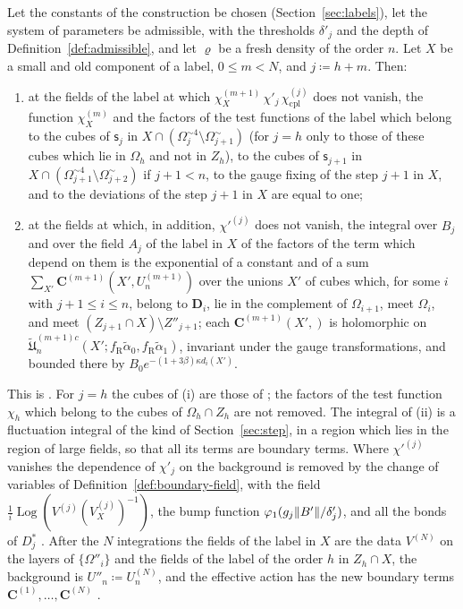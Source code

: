 \documentclass[11pt]{preprint}
\makeatletter
\DeclarePairedDelimiter{\norm}{\lVert}{\rVert}
\newcommand*{\bigcdot}{}%
\DeclareRobustCommand*{\bigcdot}{%
	\mathbin{\mathpalette\bigcdot@{}}%
}
\newcommand*{\bigcdot@scalefactor}{.7}
\newcommand*{\bigcdot@widthfactor}{1.15}
\newcommand*{\bigcdot@}[2]{%
	\sbox0{$#1\vcenter{}$}%
	\sbox2{$#1\cdot\m@th$}%
	\hbox to \bigcdot@widthfactor\wd2{%
		\hss
		\raise\ht0\hbox{%
			\scalebox{\bigcdot@scalefactor}{%
				\lower\ht0\hbox{$#1\bullet\m@th$}%
			}%
		}%
		\hss
	}%
}
\numberwithin{equation}{section}
\makeatother
\begin{document}
\begin{proposition}\label{prop:preparatory}
Let the constants of the construction be chosen (Section~\ref{sec:labels}), let the system of parameters be admissible, with the thresholds $\delta'_j$ and the depth of Definition~\ref{def:admissible}, and let $\varrho$ be a fresh density of the order $n$. Let $X$ be a small and old component of a label, $0 \leqslant m < N$, and $j \coloneqq h + m$. Then:
\begin{enumerate}[label=(\roman*)]
\item at the fields of the label at which $\chi^{(m+1)}_X\,\chi'_j\,\chi^{(j)}_{\mathrm{cpl}}$ does not vanish, the function $\chi^{(m)}_X$ and the factors of the test functions of the label which belong to the cubes of $\mathsf s_j$ in $X \cap (\Omega^{\sim4}_j \setminus \Omega^\sim_{j+1})$ (for $j = h$ only to those of these cubes which lie in $\Omega_h$ and not in $Z_h$), to the cubes of $\mathsf s_{j+1}$ in $X \cap (\Omega^{\sim4}_{j+1} \setminus \Omega^\sim_{j+2})$ if $j + 1 < n$, to the gauge fixing of the step $j + 1$ in $X$, and to the deviations of the step $j + 1$ in $X$ are equal to one;
\item at the fields at which, in addition, $\chi'^{(j)}$ does not vanish, the integral over $B_j$ and over the field $A_j$ of the label in $X$ of the factors of the term which depend on them is the exponential of a constant and of a sum $\sum_{X'}\mathbf C^{(m+1)}(X', U^{(m+1)}_n)$ over the unions $X'$ of cubes which, for some $i$ with $j + 1 \leqslant i \leqslant n$, belong to $\mathbf D_i$, lie in the complement of $\Omega_{i+1}$, meet $\Omega_i$, and meet $(Z_{j+1} \cap X) \setminus Z''_{j+1}$; each $\mathbf C^{(m+1)}(X', \bigcdot)$ is holomorphic on $\tilde{\mathfrak U}^{(m+1)c}_n(X'; f_{\mathrm R}\tilde\alpha_0, f_{\mathrm R}\tilde\alpha_1)$, invariant under the gauge transformations, and bounded there by $B_0e^{-(1+3\beta)\kappa d_i(X')}$.
\end{enumerate}
\end{proposition}

This is \cite[(1.29), (1.60)--(1.63), (1.70)]{BalabanLFR1}. For $j = h$ the cubes of (i) are those of \cite[p.~181]{BalabanLFR1}; the factors of the test function $\chi_h$ which belong to the cubes of $\Omega_h \cap Z_h$ are not removed. The integral of (ii) is a fluctuation integral of the kind of Section~\ref{sec:step}, in a region which lies in the region of large fields, so that all its terms are boundary terms. Where $\chi'^{(j)}$ vanishes the dependence of $\chi'_j$ on the background is removed by the change of variables of Definition~\ref{def:boundary-field}, with the field $\frac{1}{i}\operatorname{Log}(V^{(j)}(V^{(j)}_X)^{-1})$, the bump function $\varphi_1(g_j\norm{B'}/\delta'_j)$, and all the bonds of $D^*_j$ \cite[(1.59)]{BalabanLFR1}. After the $N$ integrations the fields of the label in $X$ are the data $V^{(N)}$ on the layers of $\{ \Omega''_i \}$ and the fields of the label of the order $h$ in $Z_h \cap X$, the background is $U''_n \coloneqq U^{(N)}_n$, and the effective action has the new boundary terms $\mathbf C^{(1)}, \dots, \mathbf C^{(N)}$ \cite[(1.71), (1.72)]{BalabanLFR1}.
\end{document}
